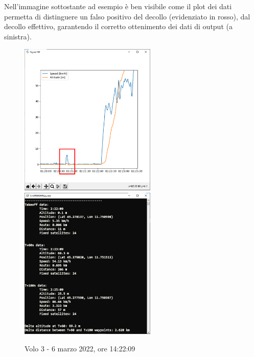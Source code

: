 \documentclass[12pt]{article}
\begin{document}
\\\\
Nell'immagine sottostante ad esempio è ben visibile come il plot dei dati permetta di distinguere un falso positivo del decollo (evidenziato in rosso), dal decollo effettivo, garantendo il corretto ottenimento dei dati di output (a sinistra).

\begin{figure}[!h]
	\centering
	\includegraphics[width=6.5cm]{img/diagramma-decollo}
	\quad
	\includegraphics[width=6.5cm]{img/screenshot}
	\captionsetup{labelformat=empty}
	\caption{Volo 3 - 6 marzo 2022, ore 14:22:09}
\end{figure}
\end{document}
